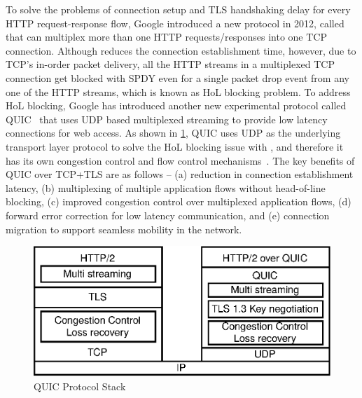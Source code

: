To solve the problems of connection setup and \ac{TLS} handshaking delay for every \ac{HTTP} request-response flow, Google introduced a new protocol in 2012, called  ~\cite{SPDYingupweb,Erman} that can multiplex more than one \ac{HTTP} requests/responses into one \ac{TCP} connection. Although  reduces the connection establishment time, however, due to \ac{TCP}'s in-order packet delivery, all the \ac{HTTP} streams in a multiplexed \ac{TCP} connection get blocked with \ac{SPDY} even for a single packet drop event from any one of the \ac{HTTP} streams, which is known as \ac{HoL} blocking problem. To address \ac{HoL} blocking, Google has introduced another new experimental protocol called \ac{QUIC}~\cite{roskind2015quic,Cui2017,Megyesi2016} that uses \ac{UDP} based multiplexed streaming to provide low latency connections for web access. As shown in \fig\ref{fig:quic-protocolstack}, \ac{QUIC} uses \ac{UDP} as the underlying transport layer protocol to solve the \ac{HoL} blocking issue with , and therefore it has its own congestion control and flow control mechanisms~\cite{Cui2017,roskind2015quic}. The key benefits of \ac{QUIC} over \ac{TCP}+\ac{TLS} are as follows -- (a) reduction in connection establishment latency, (b) multiplexing of multiple application flows without head-of-line blocking, (c) improved congestion control over multiplexed application flows, (d) forward error correction for low latency communication, and (e) connection migration to support seamless mobility in the network.

\begin{figure}[!t]
	\centering
	\includegraphics[width=0.7\linewidth]{img/quic-protocolstack}
	\caption{\acs{QUIC} Protocol Stack}
	\label{fig:quic-protocolstack}
\end{figure}


